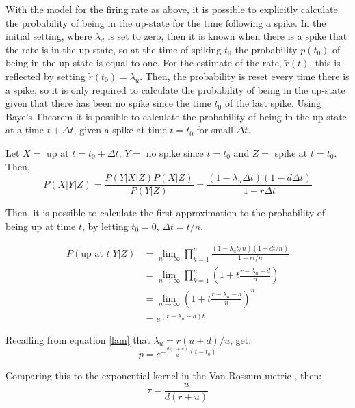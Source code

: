 \documentclass[11pt]{paper}
\begin{document}
With the model for the firing rate as above, it is possible to explicitly calculate the probability of being in the up-state for the time following a spike.  In the initial setting, where $\lambda_d$ is set to zero, then it is known when there is a spike that the rate is in the up-state, so at the time of spiking $t_0$ the probability $p(t_0)$ of being in the up-state is equal to one.  For the estimate of the rate, $\tilde{r}(t)$, this is reflected by setting $\tilde{r}(t_0) = \lambda_u$.  Then, the probability is reset every time there is a spike, so it is only required to calculate the probability of being in the up-state given that there has been no spike since the time $t_0$ of the last spike.  Using Baye's Theorem it is possible to calculate the probability of being in the up-state at a time $t+\Delta t$, given a spike at time $t=t_0$ for small $\Delta t$.

Let $X=$ up at $t=t_0+\Delta t$, $Y=$ no spike since $t=t_0$ and $Z=$ spike at $t=t_0$. Then,
\begin{equation}\label{p}
P(X|Y|Z) = \frac{P(Y|X|Z)P(X|Z)}{P(Y|Z)} = \frac{(1-\lambda_u \Delta t) (1-d \Delta t)}{1-r\Delta t}
\end{equation}

Then, it is possible to calculate the first approximation to the probability  of being up at time $t$, by letting $t_0=0, \,\Delta t =t/n$.

\begin{equation}
\begin{split}
P(\mbox{up at } t | Y | Z)   &=  \lim_{n \rightarrow \infty}\prod_{k=1}^n \frac{(1-\lambda_ut/n)(1-dt/n)}{1-rt/n}  \\
&= \lim_{n \rightarrow \infty} \prod_{k=1}^n \left(1+ t\frac{r-\lambda_u-d}{n}\right) \\
& = \lim_{n \rightarrow \infty} \left(1 + t\frac{r-\lambda_u -d}{n} \right)^n \\
&=  e^{(r-\lambda_u-d)t}
\end{split}
\end{equation}

Recalling from equation \ref{lam} that $\lambda_u = r(u+d)/u$, get:
\begin{equation}
p=e^{-\frac{d(r+u)}{u}(t-t_0)}
\end{equation}

Comparing this to the exponential kernel in the Van Rossum metric \cite{vanRossum2001}, then:
\begin{equation}
\tau = \frac{u}{d(r+u)}
\end{equation}
\end{document}
